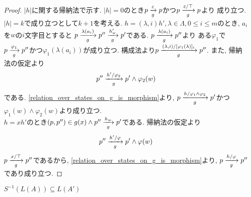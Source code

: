 \documentclass[uplatex,dvipdfmx,a4j]{jsreport}
\begin{document}
  \begin{proof}
    $|h|$に関する帰納法で示す.
    $|h| = 0$のとき$p \transarrow{\varepsilon}{g} p$かつ$p \transarrow{\varepsilon / \top}{g} p$より
    成り立つ. \\
    $|h| = k$で成り立つとして$k + 1$を考える.
    $h = (\lambda, i) h', \lambda \in \Lambda, 0 \leq i \le m$のとき,
    $a_i$を$w$の$i$文字目とすると
    $p \transarrow{\lambda(a_i)}{g} p'' \transarrow{h'_w}{g} p'$である.
    $p \transarrow{\lambda(a_i)}{g} p''$より
    ある$\varphi_1$で$p \transarrow{\varphi_1}{g} p''$かつ$\varphi_1(\lambda(a_i))$が成り立つ.
    構成法より$p \transarrow{(\lambda, i) / [\varphi_1(\lambda)]_i}{g} p''$.
    また, 帰納法の仮定より
    \[
      p'' \transarrow{h' / \varphi_2}{g} p' \land \varphi_2(w)
    \]
    である.
    \ref{relation_over_states_on_g_is_morphism}より,
    $p \transarrow{h / \varphi_1 \land \varphi_2}{g} p'$かつ
    $\varphi_1(w) \land \varphi_2(w)$より成り立つ.  \\
    $h = x h'$のとき$(p, p'') \in g(x) \land p'' \transarrow{h_w}{g} p'$である.
    帰納法の仮定より
    \[
      p'' \transarrow{h' / \varphi}{g} p' \land \varphi(w)
    \]
    $p \transarrow{x / \top}{g} p''$であるから,
    \ref{relation_over_states_on_g_is_morphism}より,
    $p \transarrow{h / \varphi}{g} p''$であり成り立つ.
  \end{proof}

  \begin{theorem} \label{symbolic_completeness}
    $S^{-1}(L(A)) \subseteq L(A')$
  \end{theorem}
\end{document}
